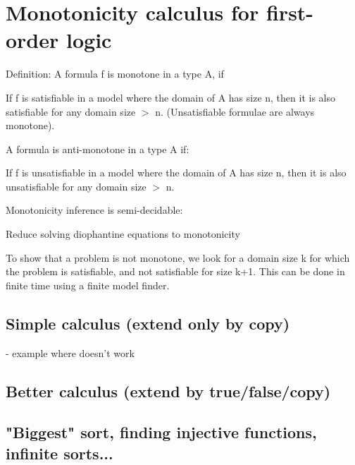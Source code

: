 \section{Monotonicity calculus for first-order logic}


Definition:
A formula f is monotone in a type A, if

  If f is satisfiable in a model where the domain of A has size n,
  then it is also satisfiable for any domain size $>$ n.
  (Unsatisfiable formulae are always monotone).

A formula is anti-monotone in a type A if:

  If f is unsatisfiable in a model where the domain of A has size n,
  then it is also unsatisfiable for any domain size $>$ n.

Monotonicity inference is semi-decidable:

Reduce solving diophantine equations to monotonicity

To show that a problem is not monotone, we look for a domain size
k for which the problem is satisfiable, and not satisfiable for size k+1.
This can be done in finite time using a finite model finder.



\subsection{Simple calculus (extend only by copy)}

- example where doesn't work

\subsection{Better calculus (extend by true/false/copy)}


\subsection{ "Biggest" sort, finding injective functions, infinite sorts...}























